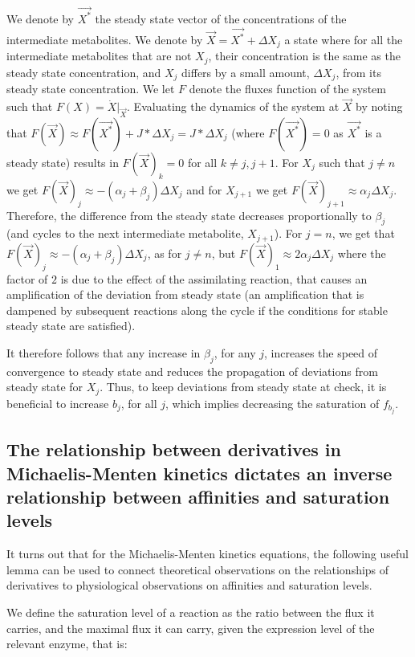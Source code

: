  We denote by $\vec{X^*}$ the steady state vector of the concentrations of the intermediate metabolites.
 We denote by $\vec{X}=\vec{X^*}+\Delta X_j$ a state where for all the intermediate metabolites that are not $X_j$, their concentration is the same as the steady state concentration, and $X_j$ differs by a small amount, $\Delta X_j$, from its steady state concentration.
 We let $F$ denote the fluxes function of the system such that $F(X)=\dot{X}\vert_{\vec{X}}$.
 Evaluating the dynamics of the system at $\vec{X}$ by noting that $F(\vec{X})\approx F(\vec{X^*})+J*\Delta X_j=J*\Delta X_j$ (where $F(\vec{X^*})=0$ as $\vec{X^*}$ is a steady state) results in $F(\vec{X})_k=0$ for all $k\neq j,j+1$.
 For $X_j$ such that $j\neq n$ we get $F(\vec{X})_j\approx -(\alpha_j+\beta_j)\Delta X_j$ and for $X_{j+1}$ we get $F(\vec{X})_{j+1}\approx \alpha_{j}\Delta X_j$.
 Therefore, the difference from the steady state decreases proportionally to $\beta_j$ (and cycles to the next intermediate metabolite, $X_{j+1}$).
 For $j=n$, we get that $F(\vec{X})_j\approx -(\alpha_j+\beta_j)\Delta X_j$, as for $j\neq n$, but $F(\vec{X})_{1}\approx 2\alpha_{j}\Delta X_j$ where the factor of $2$ is due to the effect of the assimilating reaction, that causes an amplification of the deviation from steady state (an amplification that is dampened by subsequent reactions along the cycle if the conditions for stable steady state are satisfied).

 It therefore follows that any increase in $\beta_j$, for any $j$, increases the speed of convergence to steady state and reduces the propagation of deviations from steady state for $X_j$.
 Thus, to keep deviations from steady state at check, it is beneficial to increase $b_j$, for all $j$, which implies decreasing the saturation of $f_{b_j}$.


    \subsection{The relationship between derivatives in Michaelis-Menten kinetics dictates an inverse relationship between affinities and saturation levels}
    It turns out that for the Michaelis-Menten kinetics equations, the following useful lemma can be used to connect theoretical observations on the relationships of derivatives to physiological observations on affinities and saturation levels.

    We define the saturation level of a reaction as the ratio between the flux it carries, and the maximal flux it can carry, given the expression level of the relevant enzyme, that is:

